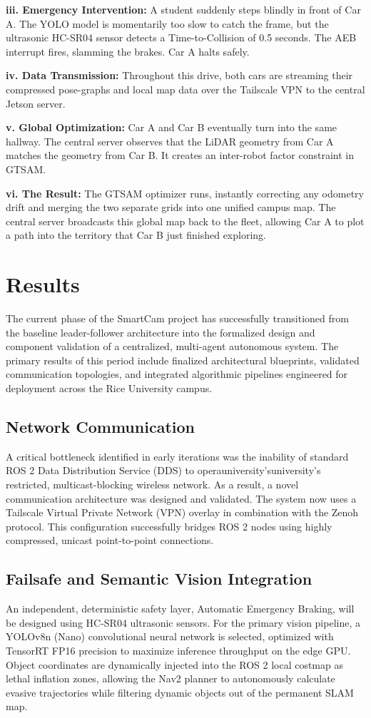 \documentclass[journal,transmag]{IEEEtran}
\begin{document}
\textbf{iii. Emergency Intervention:} A student suddenly steps blindly in front of Car A. The YOLO model is momentarily too slow to catch the frame, but the ultrasonic HC-SR04 sensor detects a Time-to-Collision of 0.5 seconds. The AEB interrupt fires, slamming the brakes. Car A halts safely.

\textbf{iv. Data Transmission:} Throughout this drive, both cars are streaming their compressed pose-graphs and local map data over the Tailscale VPN to the central Jetson server.

\textbf{v. Global Optimization:} Car A and Car B eventually turn into the same hallway. The central server observes that the LiDAR geometry from Car A matches the geometry from Car B. It creates an inter-robot factor constraint in GTSAM.

\textbf{vi. The Result:} The GTSAM optimizer runs, instantly correcting any odometry drift and merging the two separate grids into one unified campus map. The central server broadcasts this global map back to the fleet, allowing Car A to plot a path into the territory that Car B just finished exploring.


\section{Results}
The current phase of the SmartCam project has successfully transitioned from the baseline leader-follower architecture into the formalized design and component validation of a centralized, multi-agent autonomous system. The primary results of this period include finalized architectural blueprints, validated communication topologies, and integrated algorithmic pipelines engineered for deployment across the Rice University campus.

\subsection{Network Communication}
A critical bottleneck identified in early iterations was the inability of standard ROS 2 Data Distribution Service (DDS) to operauniversity'suniversity’s restricted, multicast-blocking wireless network. As a result, a novel communication architecture was designed and validated. The system now uses a Tailscale Virtual Private Network (VPN) overlay in combination with the Zenoh protocol. This configuration successfully bridges ROS 2 nodes using highly compressed, unicast point-to-point connections.

\subsection{Failsafe and Semantic Vision Integration}
An independent, deterministic safety layer, Automatic Emergency Braking, will be designed using HC-SR04 ultrasonic sensors. For the primary vision pipeline, a YOLOv8n (Nano) convolutional neural network is selected, optimized with TensorRT FP16 precision to maximize inference throughput on the edge GPU. Object coordinates are dynamically injected into the ROS 2 local costmap as lethal inflation zones, allowing the Nav2 planner to autonomously calculate evasive trajectories while filtering dynamic objects out of the permanent SLAM map.
\end{document}
